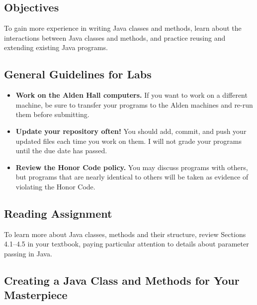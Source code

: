 


\vspace{-0.2in}
\subsection*{Objectives}
\vspace{-0.05in}

To gain more experience in writing Java classes and methods, learn about the interactions between Java classes and
methods, and practice reusing and extending existing Java programs.  

\vspace{-0.2in}
\subsection*{General Guidelines for Labs}
\vspace{-0.05in}
\begin{itemize}
\item
{\bf Work on the Alden Hall computers.} If you want to work on a different
machine, be sure to transfer your programs to the Alden
machines and re-run them before submitting.
\item
{\bf Update your repository often!} You should add, commit, 
and push your updated files each time you work on them.  I will not grade 
your programs until the due date has passed.
\item
{\bf Review the Honor Code policy.} You
may discuss programs with others, but programs that are nearly identical
to others will be taken as evidence of violating the Honor Code.
\end{itemize}

\vspace{-0.2in}
\subsection*{Reading Assignment}
\vspace{-0.05in}

To learn more about Java classes, methods and their structure, review Sections 4.1--4.5 in your textbook, paying
particular attention to details about parameter passing in Java.

\vspace{-0.2in}
\subsection*{Creating a Java Class and Methods for Your Masterpiece}
\vspace{-0.05in}

